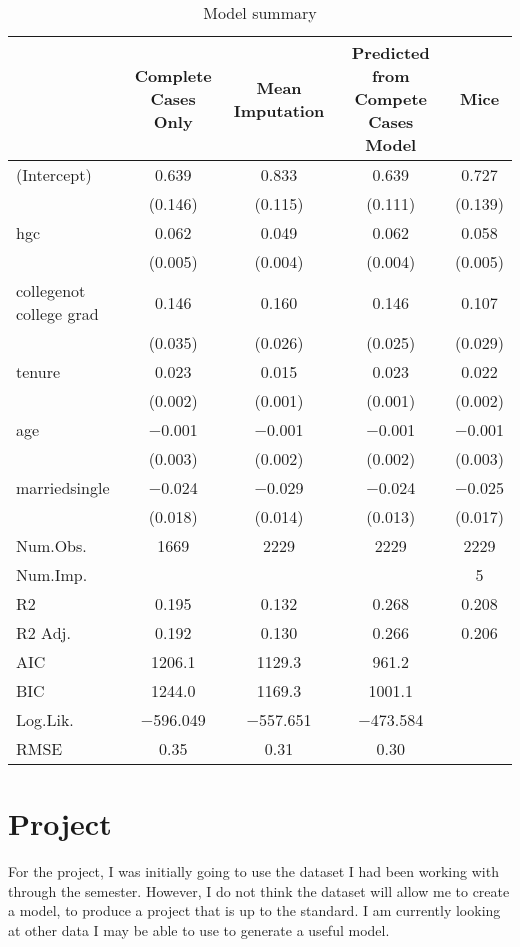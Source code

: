 \documentclass{article}
\begin{document}
\begin{sidewaystable}
  \centering
\begin{tabular}[ht]{lcccc}
\toprule
  & Complete Cases Only & Mean Imputation & Predicted from Compete Cases Model & Mice\\
\midrule
(Intercept) & \num{0.639} & \num{0.833} & \num{0.639} & \num{0.727}\\
 & (\num{0.146}) & (\num{0.115}) & (\num{0.111}) & (\num{0.139})\\
hgc & \num{0.062} & \num{0.049} & \num{0.062} & \num{0.058}\\
 & (\num{0.005}) & (\num{0.004}) & (\num{0.004}) & (\num{0.005})\\
collegenot college grad & \num{0.146} & \num{0.160} & \num{0.146} & \num{0.107}\\
 & (\num{0.035}) & (\num{0.026}) & (\num{0.025}) & (\num{0.029})\\
tenure & \num{0.023} & \num{0.015} & \num{0.023} & \num{0.022}\\
 & (\num{0.002}) & (\num{0.001}) & (\num{0.001}) & (\num{0.002})\\
age & \num{-0.001} & \num{-0.001} & \num{-0.001} & \num{-0.001}\\
 & (\num{0.003}) & (\num{0.002}) & (\num{0.002}) & (\num{0.003})\\
marriedsingle & \num{-0.024} & \num{-0.029} & \num{-0.024} & \num{-0.025}\\
 & (\num{0.018}) & (\num{0.014}) & (\num{0.013}) & (\num{0.017})\\
\midrule
Num.Obs. & \num{1669} & \num{2229} & \num{2229} & \num{2229}\\
Num.Imp. &  &  &  & \num{5}\\
R2 & \num{0.195} & \num{0.132} & \num{0.268} & \num{0.208}\\
R2 Adj. & \num{0.192} & \num{0.130} & \num{0.266} & \num{0.206}\\
AIC & \num{1206.1} & \num{1129.3} & \num{961.2} & \\
BIC & \num{1244.0} & \num{1169.3} & \num{1001.1} & \\
Log.Lik. & \num{-596.049} & \num{-557.651} & \num{-473.584} & \\
RMSE & \num{0.35} & \num{0.31} & \num{0.30} & \\
\bottomrule
\end{tabular}
\caption{Model summary}
\label{Table:2}
\end{sidewaystable}

\section{Project}
For the project, I was initially going to use the dataset I had been working with through the semester. However, I do not think the dataset will allow me to create a model, to produce a project that is up to the standard. I am currently looking at other data I may be able to use to generate a useful model.
\end{document}
